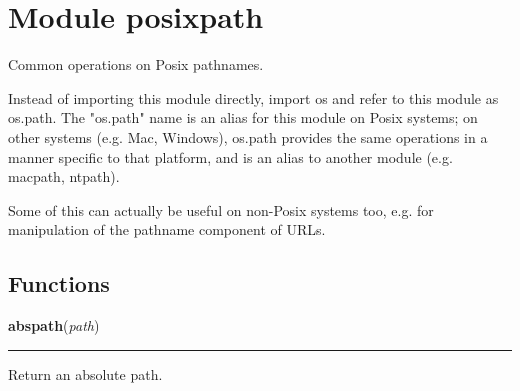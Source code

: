 %
%
%


\section{Module posixpath}

    \label{posixpath}
Common operations on Posix pathnames.

Instead of importing this module directly, import os and refer to this 
module as os.path.  The "os.path" name is an alias for this module on Posix
systems; on other systems (e.g. Mac, Windows), os.path provides the same 
operations in a manner specific to that platform, and is an alias to 
another module (e.g. macpath, ntpath).

Some of this can actually be useful on non-Posix systems too, e.g. for 
manipulation of the pathname component of URLs.



  \subsection{Functions}

    \label{posixpath:abspath}

    \vspace{0.5ex}

\hspace{.8\funcindent}\begin{boxedminipage}{\funcwidth}

    \raggedright \textbf{abspath}(\textit{path})

    \vspace{-1.5ex}

    \rule{\textwidth}{0.5\fboxrule}
\setlength{\parskip}{2ex}
    Return an absolute path.

\setlength{\parskip}{1ex}
    \end{boxedminipage}

